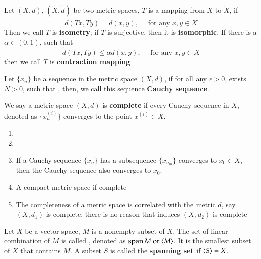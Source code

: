 \begin{definition}\label{def:1.10}
    Let $(X, d)$, $(\tilde{X}, \tilde{d})$ be two metric spaces, $T$ is a mapping from $X$ to $\tilde{X}$, if 
    $$\tilde{d}(Tx, Ty) = d(x, y), \quad \text{ for any }x, y \in X$$
    Then we call $T$ is \textbf{isometry}; if $T$ is surjective, then it is \textbf{isomorphic}. If there is a $\alpha \in (0, 1)$, such that
    $$\tilde{d}(Tx, Ty) \leq \alpha d(x, y), \quad \text{ for any }x, y \in X$$
    then we call $T$ is \textbf{contraction mapping}
\end{definition}

\begin{definition}\label{def:1.11}
    Let $\{x_n\}$ be a sequence in the metric space $(X, d)$, if for all any $\epsilon > 0$, exists $N > 0$, such that , then, we call this sequence \textbf{Cauchy sequence}.
    
    We say a metric space $(X, d)$ is \textbf{complete} if every Cauchy sequence in $X$, denoted as $\{x_n^{(i)}\}$ converges to the point $x^{(i)} \in X$. 
\end{definition}
\begin{Remark}
\begin{enumerate}[itemsep=0pt, topsep=0pt]
    \item[]
    \item {}
    \item If a Cauchy sequence $\{x_n\}$ has a subsequence $\{x_{n_m}\}$ converges to $x_0 \in X$, then the Cauchy sequence also converges to $x_0$.
    \item A compact metric space if complete
    \item The completeness of a metric space is correlated with the metric $d$, say $(X, d_1)$ is complete, there is no reason that induces $(X, d_2)$ is complete
\end{enumerate}
\end{Remark}

\begin{definition}\label{def:1.12}
    Let $X$ be a vector space, $M$ is a nonempty subset of $X$. The set of linear combination of $M$ is called , denoted as $\operatorname{span}{M} \text{ or } \langle M\rangle$. It is the smallest subset of $X$ that contains $M$. A subset $S$ is called the \textbf{spanning set} if $\langle S\rangle = X$.
\end{definition}

